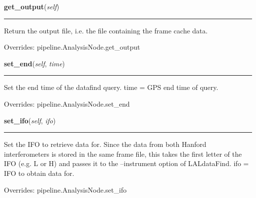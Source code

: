     \label{inspiral:DataFindNode:get_output}
    \vspace{0.5ex}

    \noindent\begin{boxedminipage}{\textwidth}

    \raggedright \textbf{get\_output}(\textit{self})

    \vspace{-1.5ex}

    \rule{\textwidth}{0.5\fboxrule}
    Return the output file, i.e. the file containing the frame cache 
    data.

    \vspace{1ex}

      Overrides: pipeline.AnalysisNode.get\_output

    \end{boxedminipage}

    \label{inspiral:DataFindNode:set_end}
    \vspace{0.5ex}

    \noindent\begin{boxedminipage}{\textwidth}

    \raggedright \textbf{set\_end}(\textit{self}, \textit{time})

    \vspace{-1.5ex}

    \rule{\textwidth}{0.5\fboxrule}
    Set the end time of the datafind query. time = GPS end time of query.

    \vspace{1ex}

      Overrides: pipeline.AnalysisNode.set\_end

    \end{boxedminipage}

    \label{inspiral:DataFindNode:set_ifo}
    \vspace{0.5ex}

    \noindent\begin{boxedminipage}{\textwidth}

    \raggedright \textbf{set\_ifo}(\textit{self}, \textit{ifo})

    \vspace{-1.5ex}

    \rule{\textwidth}{0.5\fboxrule}
    Set the IFO to retrieve data for. Since the data from both Hanford 
    interferometers is stored in the same frame file, this takes the 
    first letter of the IFO (e.g. L or H) and passes it to the 
    --instrument option of LALdataFind. ifo = IFO to obtain data for.

    \vspace{1ex}

      Overrides: pipeline.AnalysisNode.set\_ifo

    \end{boxedminipage}

